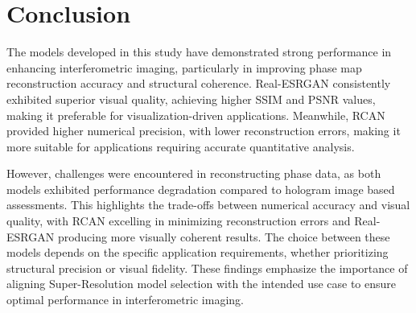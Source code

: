 \documentclass[10pt,twocolumn]{article}
\begin{document}
\section{Conclusion}
The models developed in this study have demonstrated strong performance in enhancing interferometric imaging, particularly in improving phase map reconstruction accuracy and structural coherence. Real-ESRGAN consistently exhibited superior visual quality, achieving higher SSIM and PSNR values, making it preferable for visualization-driven applications. Meanwhile, RCAN provided higher numerical precision, with lower reconstruction errors, making it more suitable for applications requiring accurate quantitative analysis.

However, challenges were encountered in reconstructing phase data, as both models exhibited performance degradation compared to hologram image based assessments. This highlights the trade-offs between numerical accuracy and visual quality, with RCAN excelling in minimizing reconstruction errors and Real-ESRGAN producing more visually coherent results. The choice between these models depends on the specific application requirements, whether prioritizing structural precision or visual fidelity. These findings emphasize the importance of aligning Super-Resolution model selection with the intended use case to ensure optimal performance in interferometric imaging.





\end{document}
